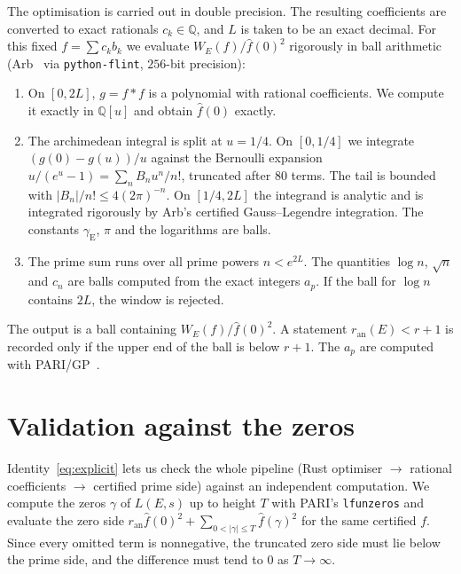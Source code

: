 \documentclass[11pt]{amsart}
\theoremstyle{remark}
\theoremstyle{definition}
\newcommand{\Q}{\mathbb{Q}}
\newcommand{\ran}{r_{\mathrm{an}}}
\begin{document}
The optimisation is carried out in double precision. The resulting coefficients are converted to exact rationals $c_k\in\Q$, and $L$ is taken to be an exact decimal. For this fixed $f=\sum c_k b_k$ we evaluate $W_E(f)/\hat f(0)^2$ rigorously in ball arithmetic (Arb~\cite{Arb} via \texttt{python-flint}, $256$-bit precision):
\begin{enumerate}
\item On $[0,2L]$, $g=f*f$ is a polynomial with rational coefficients. We compute it exactly in $\Q[u]$ and obtain $\hat f(0)$ exactly.
\item The archimedean integral is split at $u=1/4$. On $[0,1/4]$ we integrate $(g(0)-g(u))/u$ against the Bernoulli expansion $u/(e^u-1)=\sum_n B_n u^n/n!$, truncated after $80$ terms. The tail is bounded with $|B_n|/n!\le 4(2\pi)^{-n}$. On $[1/4,2L]$ the integrand is analytic and is integrated rigorously by Arb's certified Gauss--Legendre integration. The constants $\gamma_{\mathrm E}$, $\pi$ and the logarithms are balls.
\item The prime sum runs over all prime powers $n<e^{2L}$. The quantities $\log n$, $\sqrt n$ and $c_n$ are balls computed from the exact integers $a_p$. If the ball for $\log n$ contains $2L$, the window is rejected.
\end{enumerate}
The output is a ball containing $W_E(f)/\hat f(0)^2$. A statement $\ran(E)<r+1$ is recorded only if the upper end of the ball is below $r+1$. The $a_p$ are computed with PARI/GP~\cite{PARI}.

\section{Validation against the zeros}\label{sec:zeros}

Identity~\eqref{eq:explicit} lets us check the whole pipeline (Rust optimiser $\to$ rational coefficients $\to$ certified prime side) against an independent computation. We compute the zeros $\gamma$ of $L(E,s)$ up to height $T$ with PARI's \texttt{lfunzeros} and evaluate the zero side $\ran\hat f(0)^2+\sum_{0<|\gamma|\le T}\hat f(\gamma)^2$ for the same certified $f$. Since every omitted term is nonnegative, the truncated zero side must lie below the prime side, and the difference must tend to $0$ as $T\to\infty$.
\end{document}
